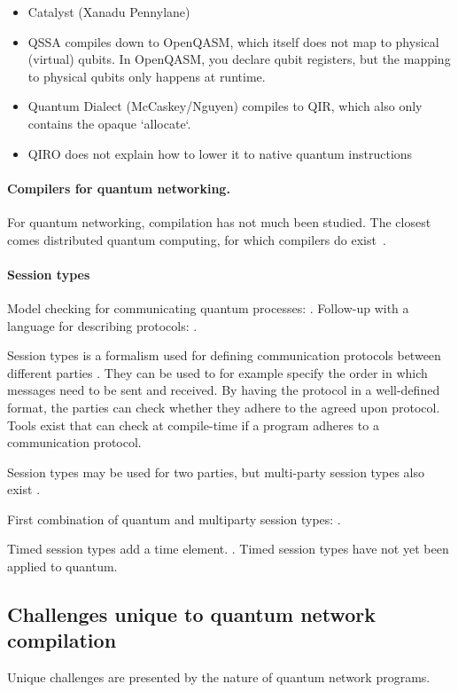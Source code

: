 \begin{itemize}
\item Catalyst (Xanadu Pennylane)
\item QSSA compiles down to OpenQASM, which itself does not map to physical (virtual) qubits. In OpenQASM, you declare qubit registers, but the mapping to physical qubits only happens at runtime.
\item Quantum Dialect (McCaskey/Nguyen) compiles to QIR, which also only contains the opaque `allocate`.
\item QIRO does not explain how to lower it to native quantum instructions
\end{itemize}

\paragraph{Compilers for quantum networking.}
For quantum networking, compilation has not much been studied.
The closest comes distributed quantum computing, for which compilers do exist~\cite{ferrari_compiler_2021, chatterjee_qurzon_2022, cuomo_optimized_2023, ferrari_modular_2023}.


\paragraph{Session types}
Model checking for communicating quantum processes: \cite{davidson_model_nodate}.
Follow-up with a language for describing protocols: \cite{ardeshir-larijani_automated_2018}.

Session types is a formalism used for defining communication protocols between different parties \cite{honda_language_1998}.
They can be used to for example specify the order in which messages need to be sent and received.
By having the protocol in a well-defined format, the parties can check whether they adhere to the agreed upon protocol.
Tools exist that can check at compile-time if a program adheres to a communication protocol.

Session types may be used for two parties, but multi-party session types also exist \cite{honda_multiparty_2016}.

First combination of quantum and multiparty session types: \cite{lanese_towards_2024}.

Timed session types add a time element. \cite{bartoletti_timed_2017}.
Timed session types have not yet been applied to quantum.


\subsection{Challenges unique to quantum network compilation}
Unique challenges are presented by the nature of quantum network programs.

